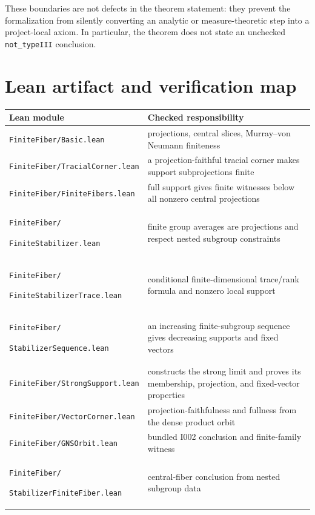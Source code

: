 \documentclass[11pt,reqno]{amsart}
\numberwithin{equation}{section}
\theoremstyle{definition}
\theoremstyle{remark}
\begin{document}
These boundaries are not defects in the theorem statement: they prevent the
formalization from silently converting an analytic or measure-theoretic step
into a project-local axiom.  In particular, the theorem does not state an
unchecked \texttt{not\_typeIII} conclusion.

\section{Lean artifact and verification map}
\label{sec:verification}

\begin{center}\footnotesize
\begin{tabular}{p{.34\linewidth}p{.58\linewidth}}
\hline
Lean module & Checked responsibility \\
\hline
\texttt{FiniteFiber/Basic.lean} & projections, central slices, Murray--von Neumann finiteness \\
\texttt{FiniteFiber/TracialCorner.lean} & a projection-faithful tracial corner makes support subprojections finite \\
\texttt{FiniteFiber/FiniteFibers.lean} & full support gives finite witnesses below all nonzero central projections \\
\texttt{FiniteFiber/}\par\texttt{FiniteStabilizer.lean} & finite group averages are projections and respect nested subgroup constraints \\
\texttt{FiniteFiber/}\par\texttt{FiniteStabilizerTrace.lean} & conditional finite-dimensional trace/rank formula and nonzero local support \\
\texttt{FiniteFiber/}\par\texttt{StabilizerSequence.lean} & an increasing finite-subgroup sequence gives decreasing supports and fixed vectors \\
\texttt{FiniteFiber/StrongSupport.lean} & constructs the strong limit and proves its membership, projection, and fixed-vector properties \\
\texttt{FiniteFiber/VectorCorner.lean} & projection-faithfulness and fullness from the dense product orbit \\
\texttt{FiniteFiber/GNSOrbit.lean} & bundled I002 conclusion and finite-family witness \\
\texttt{FiniteFiber/}\par\texttt{StabilizerFiniteFiber.lean} & central-fiber conclusion from nested subgroup data \\
\hline
\end{tabular}
\end{center}
\end{document}
